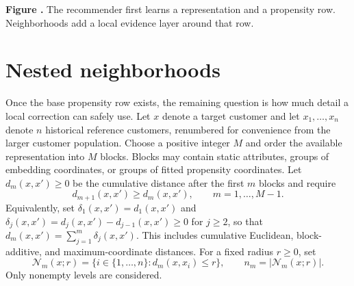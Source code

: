 \documentclass[11pt]{article}
\theoremstyle{noteplain}
\theoremstyle{definition}
\newcommand{\cN}{\mathcal N}
\begin{document}
\begin{center}
\parbox{.94\linewidth}{\small\textbf{Figure \thefigure.} The recommender first learns a representation and a propensity row. Neighborhoods add a local evidence layer around that row.}
\label{fig:pipeline}
\end{center}

\section{Nested neighborhoods}

Once the base propensity row exists, the remaining question is how much detail a local correction can safely use. Let $x$ denote a target customer and let $x_1,\ldots,x_n$ denote $n$ historical reference customers, renumbered for convenience from the larger customer population. Choose a positive integer $M$ and order the available representation into $M$ blocks. Blocks may contain static attributes, groups of embedding coordinates, or groups of fitted propensity coordinates. Let $d_m(x,x')\geq0$ be the cumulative distance after the first $m$ blocks and require
\[
 d_{m+1}(x,x')\geq d_m(x,x'),\qquad m=1,\ldots,M-1.
\]
Equivalently, set $\delta_1(x,x')=d_1(x,x')$ and $\delta_j(x,x')=d_j(x,x')-d_{j-1}(x,x')\geq0$ for $j\geq2$, so that $d_m(x,x')=\sum_{j=1}^m\delta_j(x,x')$. This includes cumulative Euclidean, block-additive, and maximum-coordinate distances. For a fixed radius $r\geq0$, set
\[
 \cN_m(x;r)=\{i\in\{1,\ldots,n\}:d_m(x,x_i)\leq r\},
 \qquad n_m=|\cN_m(x;r)|.
\]
Only nonempty levels are considered.
\end{document}
